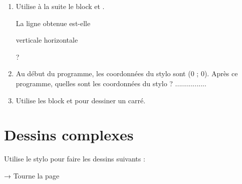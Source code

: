 \documentclass[a4paper,11pt]{article}
\begin{document}
\begin{enumerate}
	\item Utilise à la suite le block  et .

	      La ligne obtenue est-elle \vspace{0.5em}

	      \hspace{5em} verticale \hfill horizontale \hspace{10em}

	      ?
	\item  Au début du programme, les coordonnées du stylo sont (0 ; 0). Après ce programme, quelles sont les coordonnées du stylo ? ................
	\item Utilise les block  et  pour dessiner un carré.
\end{enumerate}

\section{Dessins complexes}

Utilise le stylo pour faire les dessins suivants :

\hfill → {\footnotesize Tourne la page}
\end{document}
